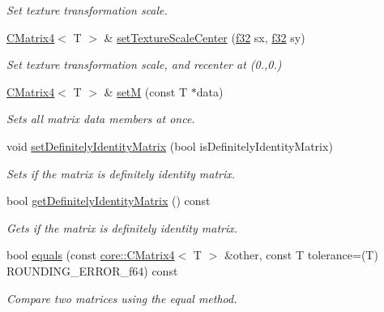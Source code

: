 \begin{DoxyCompactItemize}
\begin{DoxyCompactList}\small\item\em Set texture transformation scale. \end{DoxyCompactList}\item 
\hyperlink{classirr_1_1core_1_1CMatrix4}{C\+Matrix4}$<$ T $>$ \& \hyperlink{classirr_1_1core_1_1CMatrix4_adbd668867d117dc9331e68abef0af221}{set\+Texture\+Scale\+Center} (\hyperlink{namespaceirr_a0277be98d67dc26ff93b1a6a1d086b07}{f32} sx, \hyperlink{namespaceirr_a0277be98d67dc26ff93b1a6a1d086b07}{f32} sy)
\begin{DoxyCompactList}\small\item\em Set texture transformation scale, and recenter at (0.,0.) \end{DoxyCompactList}\item 
\mbox{\label{classirr_1_1core_1_1CMatrix4_ae59fb2248865eba3026d13b9756ba1e1}} 
\hyperlink{classirr_1_1core_1_1CMatrix4}{C\+Matrix4}$<$ T $>$ \& \hyperlink{classirr_1_1core_1_1CMatrix4_ae59fb2248865eba3026d13b9756ba1e1}{setM} (const T $\ast$data)
\begin{DoxyCompactList}\small\item\em Sets all matrix data members at once. \end{DoxyCompactList}\item 
\mbox{\label{classirr_1_1core_1_1CMatrix4_a87f7195337a2bf7a49978c2ec1100c0a}} 
void \hyperlink{classirr_1_1core_1_1CMatrix4_a87f7195337a2bf7a49978c2ec1100c0a}{set\+Definitely\+Identity\+Matrix} (bool is\+Definitely\+Identity\+Matrix)
\begin{DoxyCompactList}\small\item\em Sets if the matrix is definitely identity matrix. \end{DoxyCompactList}\item 
\mbox{\label{classirr_1_1core_1_1CMatrix4_af71afd95d942162c1ba5f38b01396dd3}} 
bool \hyperlink{classirr_1_1core_1_1CMatrix4_af71afd95d942162c1ba5f38b01396dd3}{get\+Definitely\+Identity\+Matrix} () const
\begin{DoxyCompactList}\small\item\em Gets if the matrix is definitely identity matrix. \end{DoxyCompactList}\item 
\mbox{\label{classirr_1_1core_1_1CMatrix4_abd3c6b6c69db075a70f65d3030113d3f}} 
bool \hyperlink{classirr_1_1core_1_1CMatrix4_abd3c6b6c69db075a70f65d3030113d3f}{equals} (const \hyperlink{classirr_1_1core_1_1CMatrix4}{core\+::\+C\+Matrix4}$<$ T $>$ \&other, const T tolerance=(T) R\+O\+U\+N\+D\+I\+N\+G\+\_\+\+E\+R\+R\+O\+R\+\_\+f64) const
\begin{DoxyCompactList}\small\item\em Compare two matrices using the equal method. \end{DoxyCompactList}\end{DoxyCompactItemize}


